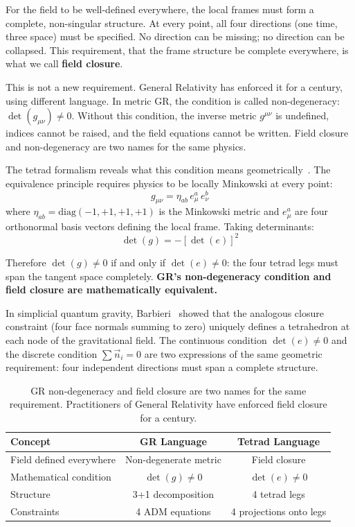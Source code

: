 \documentclass[aps,prd,preprint,superscriptaddress,showpacs,preprintnumbers,amsmath,amssymb,nofootinbib]{revtex4-2}
\begin{document}
For the field to be well-defined everywhere, the local frames must form a complete, non-singular structure. At every point, all four directions (one time, three space) must be specified. No direction can be missing; no direction can be collapsed. This requirement, that the frame structure be complete everywhere, is what we call \textbf{field closure}.

This is not a new requirement. General Relativity has enforced it for a century, using different language. In metric GR, the condition is called non-degeneracy: $\det(g_{\mu\nu}) \neq 0$. Without this condition, the inverse metric $g^{\mu\nu}$ is undefined, indices cannot be raised, and the field equations cannot be written. Field closure and non-degeneracy are two names for the same physics.

The tetrad formalism reveals what this condition means geometrically~\cite{mtw1973,wald1984}. The equivalence principle requires physics to be locally Minkowski at every point:
\begin{equation}
g_{\mu\nu} = \eta_{ab}\, e^a_\mu\, e^b_\nu
\label{eq:tetrad}
\end{equation}
where $\eta_{ab} = \text{diag}(-1, +1, +1, +1)$ is the Minkowski metric and $e^a_\mu$ are four orthonormal basis vectors defining the local frame. Taking determinants:
\begin{equation}
\det(g) = -[\det(e)]^2
\label{eq:det-relation}
\end{equation}

Therefore $\det(g) \neq 0$ if and only if $\det(e) \neq 0$: the four tetrad legs must span the tangent space completely. \textbf{GR's non-degeneracy condition and field closure are mathematically equivalent.}

In simplicial quantum gravity, Barbieri~\cite{barbieri1998} showed that the analogous closure constraint (four face normals summing to zero) uniquely defines a tetrahedron at each node of the gravitational field. The continuous condition $\det(e) \neq 0$ and the discrete condition $\sum \vec{n}_i = 0$ are two expressions of the same geometric requirement: four independent directions must span a complete structure.

\begin{table}[H]
\centering
\begin{tabular*}{0.95\textwidth}{@{\extracolsep{\fill}} lcc @{}}
\toprule
\textbf{Concept} & \textbf{GR Language} & \textbf{Tetrad Language} \\
\midrule
Field defined everywhere & Non-degenerate metric & Field closure \\
Mathematical condition & $\det(g) \neq 0$ & $\det(e) \neq 0$ \\
Structure & 3+1 decomposition & 4 tetrad legs \\
Constraints & 4 ADM equations & 4 projections onto legs \\
\bottomrule
\end{tabular*}
\caption{GR non-degeneracy and field closure are two names for the same requirement. Practitioners of General Relativity have enforced field closure for a century.}
\label{tab:closure}
\end{table}
\end{document}
